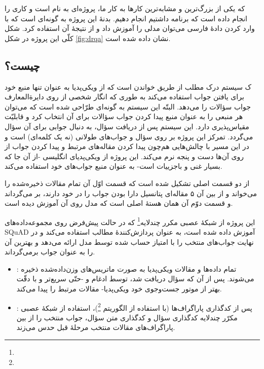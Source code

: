 \documentclass{CCI2020}
\begin{document}
که یکی از بزرگ‌ترین و مشابه‌ترین کارها به کار ما، پروژه‌ای به نام \cite{ref1}
است و کاری را انجام داده است که برنامه داشتیم انجام دهیم. بدنهٔ این پروژه به گونه‌ای است که با وارد کردن دادهٔ فارسی می‌توان مدلی را آموزش داد و از نتیجهٔ آن استفاده کرد. شکل کلّی این پروژه در شکل \ref{fig:drqa} نشان داده شده است.


\subsection{ چیست؟}
ک سیستم درک مطلب از طریق خواندن است که از ویکی‌پدیا به عنوان تنها منبع خود برای یافتن جواب استفاده می‌کند به طوری که انگار شخصی از روی دایرة‌المعارف جواب سؤالات را می‌دهد. البتّه این سیستم به گونه‌ای طرّاحی شده است که می‌توان هر منبعی را به عنوان منبع پیدا کردن جواب سؤالات برای آن انتخاب کرد و قابلیّت مقیاس‌پذیری دارد. این سیستم پس از دریافت سؤال، به دنبال جوابی برای آن سؤال می‌گردد. تمرکز این پروژه بر روی سؤال و جواب‌های طولانی (نه یک کلمه‌ای) است و در این مسیر با چالش‌هایی هم‌چون پیدا کردن مقاله‌های مرتبط و پیدا کردن جواب از روی آن‌ها دست و پنجه نرم می‌کند. این پروژه از ویکی‌پدیای انگلیسی -از آن جا که بسیار غنی و باجزییات است- به عنوان منبع جواب‌های خود استفاده می‌کند.

 از دو قسمت اصلی تشکیل شده است که قسمت اوّل آن تمام مقالات ذخیره‌شده را می‌خواند و از بین آن ۵ مقاله‌ای پتانسیل دارا بودن جواب را در خود دارند، بر می‌گرداند و قسمت دوّم آن همان هستهٔ اصلی است که مدل روی آن آموزش دیده است.



این پروژه از شبکهٔ عصبی مکرر چندلایه\footnote{} که در حالت پیش‌فرض روی مجموعه‌داده‌های SQuAD آموزش داده شده است، به عنوان پردازش‌کنندهٔ مطالب استفاده می‌کند و در نهایت جواب‌های منتخب را با امتیاز حساب شده توسط مدل ارائه می‌دهد و بهترین آن را به عنوان جواب برمی‌گرداند.

\begin{itemize}
    \item {}: 
 تمام داده‌ها و مقالات ویکی‌پدیا به صورت ماتریس‌های وزن‌داده‌شده  ذخیره می‌شوند. پس از آن که سؤال دریافت شد، توسط ادغام  و  -حتّی سریع‌تر و با دقّت بهتر از موتور جست‌وجوی خود ویکی‌پدیا- مقالات مرتبط را پیدا می‌کند.
 
 \item {}: پس از کدگذاری پاراگراف‌ها (با استفاده از الگوریتم \footnote{})، استفاده از شبکهٔ عصبی مکرّر چندلایه کدگذاری سؤال و کدگذاری متن سؤال، جواب منتخب را از بین پاراگراف‌های مقالات منتخب مرحلهٔ قبل حدس می‌زند.
\end{itemize}
\end{document}
